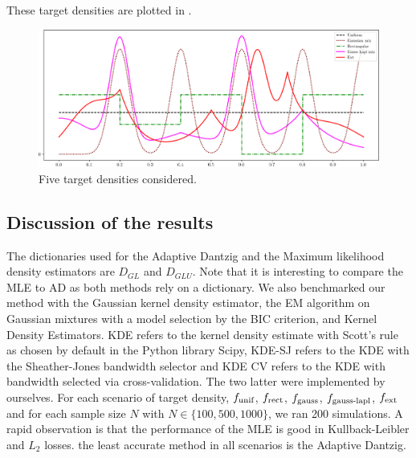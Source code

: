 These target densities are plotted in .
\begin{figure}[h]
\center
\includegraphics[width=1.1\textwidth]{TeX_files/densities_f_star.png}
\caption{Five target densities considered.}
\label{fig:target_densities}
\end{figure}

\subsection{Discussion of the results}
The dictionaries used for the Adaptive Dantzig and the Maximum likelihood density estimators are $D_{GL}$ and $D_{GLU}$. Note that it is interesting to compare the MLE to AD as both methods rely on a dictionary. We also benchmarked our method with the Gaussian kernel density estimator, the EM algorithm on Gaussian mixtures with a model selection by the BIC criterion, and Kernel Density Estimators. KDE refers to the kernel density estimate with Scott's rule as chosen by default in the Python library Scipy, KDE-SJ refers to the KDE with the Sheather-Jones bandwidth selector and KDE CV refers to the KDE with bandwidth selected via cross-validation. The two latter were implemented by ourselves. For each scenario of target density, $f_{\textnormal{unif}}$, $f_{\textnormal{rect}}$, $f_{\textnormal{gauss}}$, $f_{\textnormal{gauss-lapl}}$, $f_{\textnormal{ext}}$ and for each sample size $N$  with $N\in\{100, 500, 1000\}$, we ran 200 simulations. A rapid observation is that the performance of the MLE is good in Kullback-Leibler and $L_2$ losses. the least accurate method in all scenarios is the Adaptive Dantzig.


